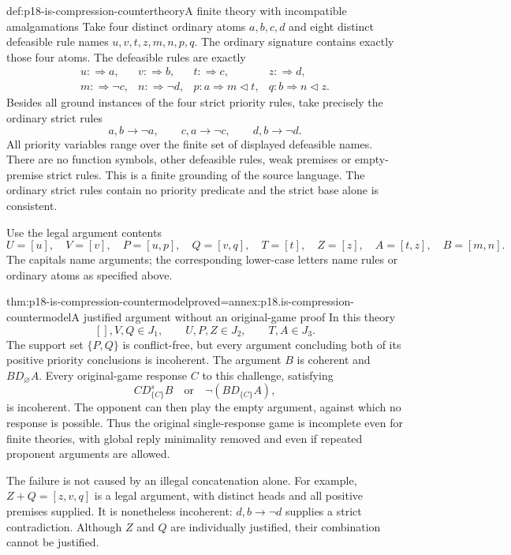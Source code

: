 \begin{hbdefinition}{def:p18-is-compression-countertheory}{A finite theory with incompatible amalgamations}
Take four distinct ordinary atoms \(a,b,c,d\) and eight distinct defeasible
rule names \(u,v,t,z,m,n,p,q\).
The ordinary signature contains exactly those four atoms.
The defeasible rules are exactly
\[
\begin{array}{llll}
u:\Rightarrow a,&v:\Rightarrow b,&t:\Rightarrow c,&z:\Rightarrow d,\\
m:\Rightarrow\neg c,&n:\Rightarrow\neg d,&
p:a\Rightarrow m\triangleleft t,&
q:b\Rightarrow n\triangleleft z.
\end{array}
\]
Besides all ground instances of the four strict priority rules,
take precisely the ordinary strict rules
\[
 a,b\to\neg a,\qquad c,a\to\neg c,\qquad d,b\to\neg d.
\]
All priority variables range over the finite set of displayed
defeasible names. There are no function symbols, other defeasible
rules, weak premises or empty-premise strict rules.
This is a finite grounding of the source language. The ordinary
strict rules contain no priority predicate and the strict base
alone is consistent.

Use the legal argument contents
\[
 U=[u],\quad V=[v],\quad P=[u,p],\quad Q=[v,q],
 \quad T=[t],\quad Z=[z],\quad A=[t,z],\quad B=[m,n].
\]
The capitals name arguments; the corresponding lower-case letters
name rules or ordinary atoms as specified above.
\end{hbdefinition}

\begin{hbtheorem}{thm:p18-is-compression-countermodel}{proved=annex:p18.is-compression-countermodel}{A justified argument without an original-game proof}
In this theory
\[
 [],V,Q\in J_1,\qquad U,P,Z\in J_2,\qquad T,A\in J_3.
\]
The support set \(\{P,Q\}\) is conflict-free, but every argument
concluding both of its positive priority conclusions is incoherent.
The argument \(B\) is coherent and \(B D_\varnothing A\).
Every original-game response \(C\) to this challenge, satisfying
\[
 C D_{\{C\}}^s B
 \quad\text{or}\quad
 \neg(B D_{\{C\}}A),
\]
is incoherent. The opponent can then play the empty argument,
against which no response is possible.
Thus the original single-response game is incomplete even for
finite theories, with global reply minimality removed and even
if repeated proponent arguments are allowed.
\end{hbtheorem}

The failure is not caused by an illegal concatenation alone.
For example, \(Z+Q=[z,v,q]\) is a legal argument, with distinct
heads and all positive premises supplied. It is nonetheless
incoherent: \(d,b\to\neg d\) supplies a strict contradiction.
Although \(Z\) and \(Q\) are individually justified, their combination
cannot be justified.

